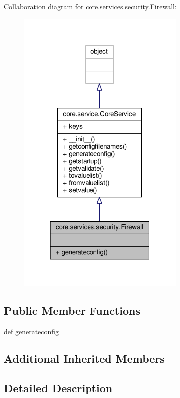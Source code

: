 Collaboration diagram for core.\+services.\+security.\+Firewall\+:
\nopagebreak
\begin{figure}[H]
\begin{center}
\leavevmode
\includegraphics[width=229pt]{classcore_1_1services_1_1security_1_1_firewall__coll__graph}
\end{center}
\end{figure}
\subsection*{Public Member Functions}
\begin{DoxyCompactItemize}
\item 
def \hyperlink{classcore_1_1services_1_1security_1_1_firewall_a08de022d3fd2212f0059f110f5b3f5e4}{generateconfig}
\end{DoxyCompactItemize}
\subsection*{Additional Inherited Members}


\subsection{Detailed Description}
\begin{DoxyVerb}\end{DoxyVerb}
 

